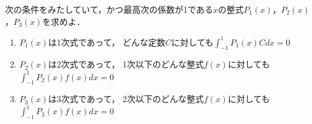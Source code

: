 \documentclass[../../main.tex]{subfiles}
\begin{document}
次の条件をみたしていて，かつ最高次の係数が1である$x$の整式$P_1(x)$，$P_2(x)$，$P_3(x)$を求めよ．
\begin{enumerate}
  \item $P_1(x)$は1次式であって，
    どんな定数$C$に対しても$\displaystyle\int_{-1}^1P_1(x)Cdx=0$
  \item $P_2(x)$は2次式であって，
    1次以下のどんな整式$f(x)$に対しても$\displaystyle\int_{-1}^1P_2(x)f(x)dx=0$
  \item $P_3(x)$は3次式であって，
    2次以下のどんな整式$f(x)$に対しても$\displaystyle\int_{-1}^1P_3(x)f(x)dx=0$
\end{enumerate}
\end{document}
